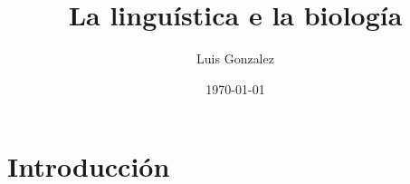 \documentclass[12pt]{article}
\title{La linguística e la biología}
\author{Luis Gonzalez}
\date{\today}
\begin{document}
\maketitle

\section{Introducción}
\end{document}
